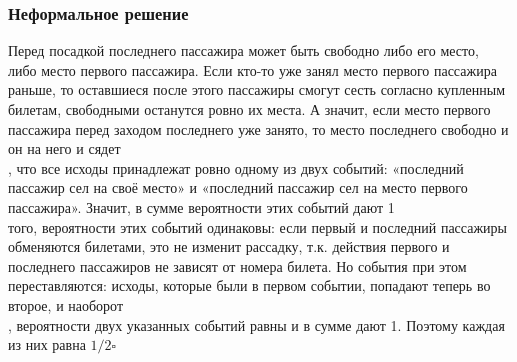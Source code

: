 \documentclass[a4paper]{article}
\newcommand{\qed}{\hfill$\square$}
\begin{document}
\subsubsection*{Неформальное решение}
Перед посадкой последнего пассажира может быть свободно либо его место, либо место первого пассажира. Если кто-то уже занял место первого пассажира раньше, то оставшиеся после этого пассажиры смогут сесть согласно купленным билетам, свободными останутся ровно их места. А значит, если место первого пассажира перед заходом последнего уже занято, то место последнего свободно и он на него и сядет\\[2mm]
, что все исходы принадлежат ровно одному из двух событий: «последний пассажир сел на своё место» и «последний пассажир сел на место первого пассажира». Значит, в сумме вероятности этих событий дают 1\\[2mm]
 того, вероятности этих событий одинаковы: если первый и последний пассажиры обменяются билетами, это не изменит рассадку, т.к. действия первого и последнего пассажиров не зависят от номера билета. Но события при этом переставляются: исходы, которые были в первом событии, попадают теперь во второе, и наоборот\\[2mm]
, вероятности двух указанных событий равны и в сумме дают 1. Поэтому каждая из них равна $1 / 2$\qed
\end{document}

